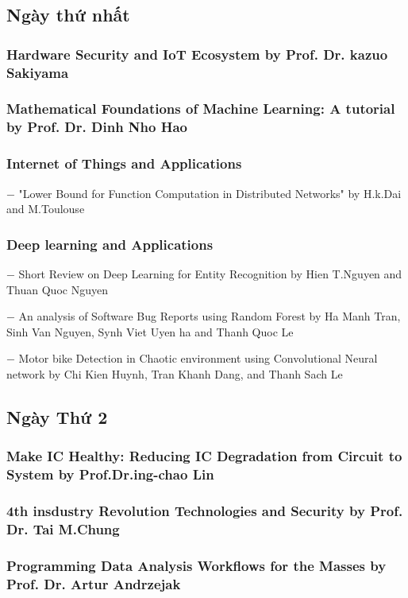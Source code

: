 \documentclass{hcmutarticle}
\begin{document}
\subsection{Ngày thứ nhất}
\subsubsection{Hardware Security and IoT Ecosystem by Prof. Dr. kazuo Sakiyama}
\subsubsection{Mathematical Foundations of Machine Learning: A tutorial by Prof. Dr. Dinh Nho Hao}
\subsubsection{Internet of Things and Applications}
$-$ "Lower Bound for Function Computation in Distributed Networks" by H.k.Dai and M.Toulouse
\subsubsection{Deep learning and Applications}
$-$ Short Review on Deep Learning for Entity Recognition by Hien T.Nguyen and Thuan Quoc Nguyen

$-$ An analysis of Software Bug Reports using Random Forest by Ha Manh Tran, Sinh Van Nguyen, Synh Viet Uyen ha and Thanh Quoc Le

$-$ Motor bike Detection in Chaotic environment using Convolutional Neural network by Chi Kien Huynh, Tran Khanh Dang, and Thanh Sach Le


\subsection{Ngày Thứ 2}
\subsubsection{Make IC Healthy: Reducing IC Degradation from Circuit to System by Prof.Dr.ing-chao Lin}

\subsubsection{4th insdustry Revolution Technologies and Security by Prof. Dr. Tai M.Chung}

\subsubsection{Programming Data Analysis Workflows for the Masses by Prof. Dr. Artur Andrzejak}
\end{document}
